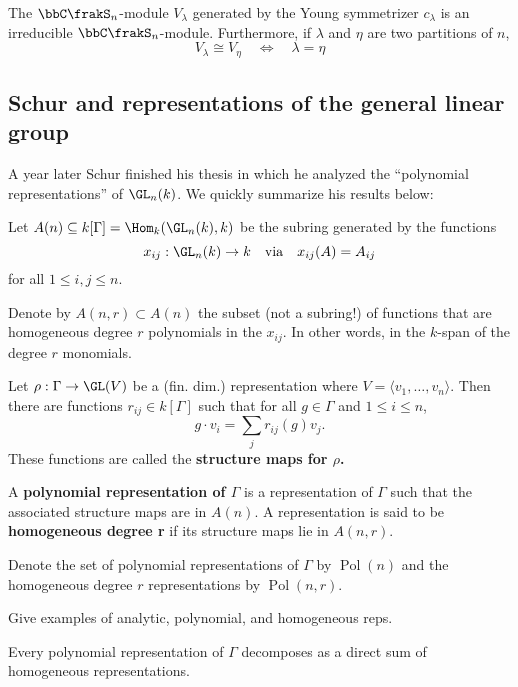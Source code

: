 \documentclass[12pt]{article}
\DeclareMathOperator{\Pol}{Pol}
\begin{document}
		\begin{thm}
			The $\bbC\frakS_n$-module $V_\lambda$ generated by the Young symmetrizer $c_\lambda$ is 
			an irreducible $\bbC\frakS_n$-module. Furthermore, if $\lambda$ and $\eta$ are two partitions of $n$,
			\[V_\lambda\cong V_\eta\quad\Leftrightarrow\quad \lambda=\eta\]
		\end{thm}

	\subsection{Schur and representations of the general linear group}
	A year later Schur finished his thesis \cite{schur-thesis} in which he analyzed the ``polynomial representations'' of $\GL_n(k)$.
	We quickly summarize his results below:

	\begin{defn}
		Let $A(n)\subseteq k[\Gamma]=\Hom_k(\GL_n(k),k)$ be the subring generated by the functions 
		\[x_{ij}:\GL_n(k)\to k\quad\text{via}\quad x_{ij}(A)=A_{ij}\]
		for all $1\le i,j\le n$.

		Denote by $A(n,r)\subset A(n)$ the subset (not a subring!) of functions that are homogeneous 
		degree $r$ polynomials in the $x_{ij}$. In other words, in the $k$-span of the degree $r$ monomials.
	\end{defn}
	\begin{defn}
		Let $\rho:\Gamma\to \GL(V)$ be a (fin. dim.) representation where $V=\langle v_1,\dots,v_n\rangle$. Then 
		there are functions $r_{ij}\in k[\Gamma]$ such that for all $g\in\Gamma$ and $1\le i\le n$,
		\[g\cdot v_i=\sum_j r_{ij}(g)v_j.\]
		These functions are called the \textbf{structure maps for $\rho$.}
	\end{defn}
	\begin{defn}
		A \textbf{polynomial representation of $\Gamma$} is a representation of $\Gamma$ such that the associated 
		structure maps are in $A(n)$. A representation is said to be \textbf{homogeneous degree r} if 
		its structure maps lie in $A(n,r)$. 
		
		Denote the set of polynomial representations of $\Gamma$ by $\Pol(n)$ and 
		the homogeneous degree $r$ representations by $\Pol(n,r)$.
	\end{defn}
	{\color{red} Give examples of analytic, polynomial, and homogeneous reps.}
	\begin{thm}[Schur]
		Every polynomial representation of $\Gamma$ decomposes as a direct sum of homogeneous representations.
	\end{thm}
\end{document}
